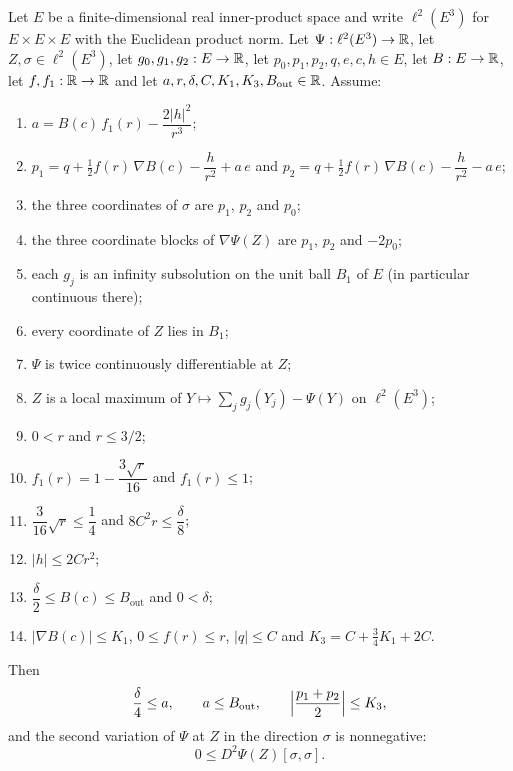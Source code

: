 \begin{lemma}
Let $E$ be a finite-dimensional real inner-product space and write
$\ell^2(E^3)$ for $E\times E\times E$ with the Euclidean product norm. Let
$\Psi:\ell^2(E^3)\to\mathbb{R}$, let $Z,\sigma\in\ell^2(E^3)$, let
$g_0,g_1,g_2:E\to\mathbb{R}$, let $p_0,p_1,p_2,q,e,c,h\in E$, let $B:E\to\mathbb{R}$, let
$f,f_1:\mathbb{R}\to\mathbb{R}$ and let $a,r,\delta,C,K_1,K_3,B_{\mathrm{out}}\in\mathbb{R}$. Assume:
\begin{enumerate}
\item\label{it:tpjm-a} $a=B(c)\,f_1(r)-\dfrac{2|h|^2}{r^3}$;
\item\label{it:tpjm-p} $p_1=q+\tfrac12f(r)\,\nabla B(c)-\dfrac{h}{r^2}+a\,e$ and
$p_2=q+\tfrac12f(r)\,\nabla B(c)-\dfrac{h}{r^2}-a\,e$;
\item\label{it:tpjm-sig} the three coordinates of $\sigma$ are $p_1$, $p_2$ and
$p_0$;
\item\label{it:tpjm-jets} the three coordinate blocks of $\nabla\Psi(Z)$ are
$p_1$, $p_2$ and $-2p_0$;
\item\label{it:tpjm-sub} each $g_j$ is an infinity subsolution on the unit ball
$B_1$ of $E$ (in particular continuous there);
\item\label{it:tpjm-mem} every coordinate of $Z$ lies in $B_1$;
\item\label{it:tpjm-C2} $\Psi$ is twice continuously differentiable at $Z$;
\item\label{it:tpjm-max} $Z$ is a local maximum of
$Y\mapsto\sum_jg_j(Y_j)-\Psi(Y)$ on $\ell^2(E^3)$;
\item\label{it:tpjm-r} $0<r$ and $r\le3/2$;
\item\label{it:tpjm-f1} $f_1(r)=1-\dfrac{3\sqrt r}{16}$ and $f_1(r)\le1$;
\item\label{it:tpjm-small} $\dfrac3{16}\sqrt r\le\dfrac14$ and
$8C^2r\le\dfrac\delta8$;
\item\label{it:tpjm-h} $|h|\le2Cr^2$;
\item\label{it:tpjm-B} $\dfrac\delta2\le B(c)\le B_{\mathrm{out}}$ and
$0<\delta$;
\item\label{it:tpjm-bd} $|\nabla B(c)|\le K_1$, $0\le f(r)\le r$, $|q|\le C$ and
$K_3=C+\tfrac34K_1+2C$.
\end{enumerate}
Then
\begin{equation}\label{eq:tpjm-bounds}
  \frac\delta4\le a,\qquad a\le B_{\mathrm{out}},\qquad
  \Bigl|\frac{p_1+p_2}{2}\Bigr|\le K_3,
\end{equation}
and the second variation of $\Psi$ at $Z$ in the direction $\sigma$ is
nonnegative:
\begin{equation}\label{eq:tpjm-Apos}
  0\le D^2\Psi(Z)[\sigma,\sigma].
\end{equation}
\end{lemma}
